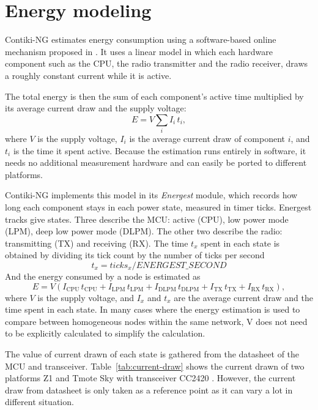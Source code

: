 \section{Energy modeling}
Contiki-NG estimates energy consumption using a
software-based online mechanism proposed in
\cite{dunkelsSoftwarebasedOnlineEnergy2007}. It uses a linear
model in which each hardware component such as the CPU, the radio transmitter
and the radio receiver, draws a roughly constant current while it is active.

The total energy is then the sum of each component's active time
multiplied by its average current draw and the supply voltage:
\begin{equation}
    E = V \sum_{i} I_i \, t_i ,
\end{equation}
where $V$ is the supply voltage, $I_i$ is the average current draw of
component $i$, and $t_i$ is the time it spent active. Because the
estimation runs entirely in software, it needs no additional
measurement hardware and can easily be ported to different platforms.

Contiki-NG implements this model in its \emph{Energest} module, which
records how long each
component stays in each power state, measured in timer ticks.
Energest tracks give states. Three describe the MCU: active (CPU),
low power mode (LPM),
deep low power mode (DLPM). The other two describe the radio:
transmitting (TX) and receiving (RX). The time $t_x$ spent in each state is
obtained by dividing its tick count by the number of ticks per second
\begin{equation}
    t_x = \mathit{ticks}_x / \mathit{ENERGEST\_SECOND}
\end{equation}
And the energy consumed by a node is estimated as
\begin{equation}
    E = V \left( I_{\mathrm{CPU}}\, t_{\mathrm{CPU}}
        + I_{\mathrm{LPM}}\, t_{\mathrm{LPM}}
        + I_{\mathrm{DLPM}}\, t_{\mathrm{DLPM}}
        + I_{\mathrm{TX}}\, t_{\mathrm{TX}}
    + I_{\mathrm{RX}}\, t_{\mathrm{RX}} \right),
\end{equation}
where $V$ is the supply voltage, and $I_x$ and $t_x$ are the
average current draw and the time spent in each state. In many cases
where the energy
estimation is used to compare between
homogeneous nodes within the same network, V does not need to be
explicitly calculated to simplify the calculation.

The value of current drawn of each state is gathered from the
datasheet of the MCU and transceiver. Table~\ref{tab:current-draw}
shows the current drawn
of two platforms Z1 \cite{zolertia_z1} and Tmote Sky
\cite{moteiv_tmotesky} with transceiver CC2420 \cite{ti_cc2420}. However, the
current draw from datasheet is only taken as a reference
point as it can vary a lot in different situation.

